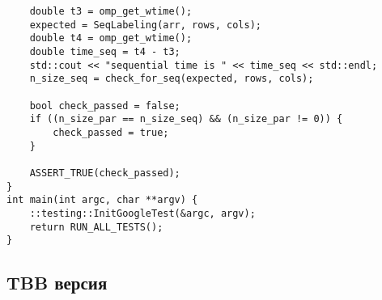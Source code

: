 \documentclass{report}
\begin{document}
\begin{lstlisting}
    double t3 = omp_get_wtime();
    expected = SeqLabeling(arr, rows, cols);
    double t4 = omp_get_wtime();
    double time_seq = t4 - t3;
    std::cout << "sequential time is " << time_seq << std::endl;
    n_size_seq = check_for_seq(expected, rows, cols);

    bool check_passed = false;
    if ((n_size_par == n_size_seq) && (n_size_par != 0)) {
        check_passed = true;
    }

    ASSERT_TRUE(check_passed);
}
int main(int argc, char **argv) {
    ::testing::InitGoogleTest(&argc, argv);
    return RUN_ALL_TESTS();
}

\end{lstlisting}

\subsection{TBB версия}
\end{document}
